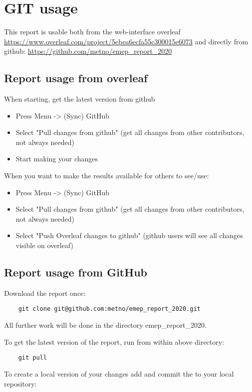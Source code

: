 \chapter{GIT usage}

This report is usable both from the web-interface overleaf \url{https://www.overleaf.com/project/5ebea6ecfa55c300015e6073} and directly from github: \url{https://github.com/metno/emep_report_2020}

\section{Report usage from overleaf}

When starting, get the latest version from github
\begin{itemize}
    \item Press Menu -> (Sync) GitHub
    \item Select "Pull changes from github" (get all changes from other contributors, not always needed)
    \item Start making your changes
\end{itemize}

When you want to make the results available for others to see/use:
\begin{itemize}
    \item Press Menu -> (Sync) GitHub
    \item Select "Pull changes from github" (get all changes from other contributors, not always needed)
    \item Select "Push Overleaf changes to github" (github users will see all changes visible on overleaf)
\end{itemize}


\section{Report usage from GitHub}

Download the report once:
\begin{verbatim}
    git clone git@github.com:metno/emep_report_2020.git
\end{verbatim}
All further work will be done in the directory emep\_report\_2020.

To get the latest version of the report, run from within above directory:
\begin{verbatim}
    git pull
\end{verbatim}

To create a local version of your changes add and commit the to your local repository:

